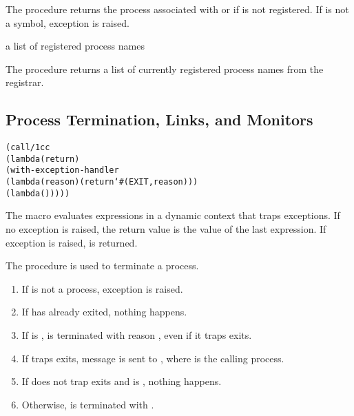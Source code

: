 The  procedure returns the process associated with
 or  if  is not registered.  If
 is not a symbol, exception  is raised.

\begin{procedure}
\end{procedure}
\returns{} a list of registered process names

The  procedure returns a list of currently
registered process names from the registrar.

\subsection {Process Termination, Links, and Monitors}

\begin{syntax}
\end{syntax}
\expandsto{}\begin{alltt}\antipar
(call/1cc
 (lambda (return)
   (with-exception-handler
    (lambda (reason) (return `#(EXIT ,reason)))
    (lambda ()   \etc{}))))\end{alltt}

The  macro evaluates expressions  
\etc{} in a dynamic context that traps exceptions.  If no exception is
raised, the return value is the value of the last expression. If
exception  is raised,  is
returned.

\begin{procedure}
\end{procedure}
\returns{} 

The  procedure is used to terminate a process.
\begin{enumerate}
\item If  is not a process, exception  is raised.
\item If  has already exited, nothing happens.
\item If  is ,  is terminated
  with reason , even if it traps exits.
\item If  traps exits, message  is sent to , where  is the
  calling process.
\item If  does not trap exits and  is
  , nothing happens.
\item Otherwise,  is terminated with .
\end{enumerate}


